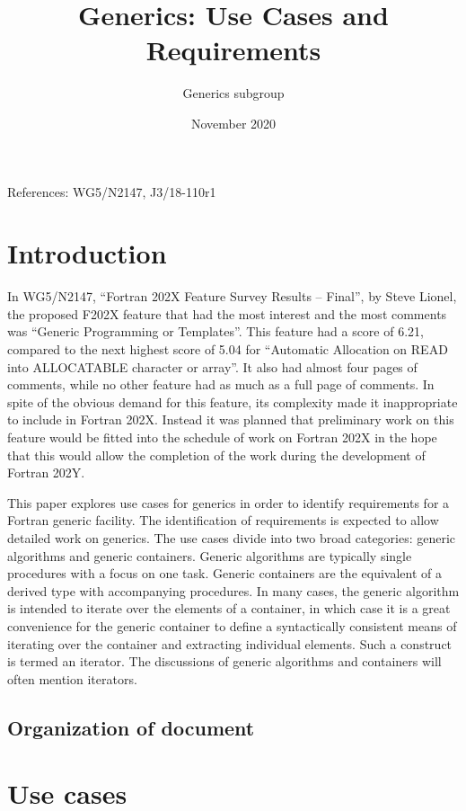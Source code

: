 \documentclass{article}
\title{Generics: Use Cases and Requirements}
\author{Generics subgroup}
\date{November 2020}
\newcounter{requirement}
\begin{document}
\maketitle
References: WG5/N2147, J3/18-110r1

\section{Introduction}

In WG5/N2147, ``Fortran 202X Feature Survey Results – Final'', by Steve
Lionel, the proposed F202X feature that had the most interest and the
most comments was ``Generic Programming or Templates''. This feature
had a score of 6.21, compared to the next highest score of 5.04 for
``Automatic Allocation on READ into ALLOCATABLE character or
array''. It also had almost four pages of comments, while no other
feature had as much as a full page of comments.
In spite of the obvious demand for this feature, its complexity made
it inappropriate to include in Fortran 202X. Instead it was planned
that preliminary work on this feature would be fitted into the
schedule of work on Fortran 202X in the hope that this would allow the
completion of the work during the development of Fortran 202Y.

This paper explores use cases for generics in order to identify
requirements for a Fortran generic facility. The identification of
requirements is expected to allow detailed work on generics. The use
cases divide into two broad categories: generic algorithms and generic
containers. Generic algorithms are typically single procedures with a
focus on one task. Generic containers are the equivalent of a
derived type with accompanying procedures. In many cases, the generic
algorithm is intended to iterate over the elements of a container, in
which case it is a great convenience for the generic container to define
a syntactically consistent means of iterating over the container and
extracting individual elements. Such a construct is termed an
iterator. The discussions of generic algorithms and containers will
often mention iterators.

\subsection{Organization of document}

\section{Use cases}
\end{document}
